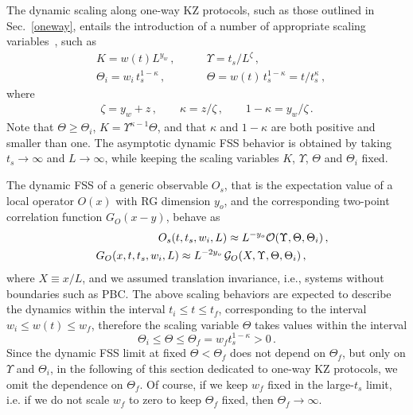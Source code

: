 The dynamic scaling along one-way KZ protocols, such as those outlined
in Sec.~\ref{oneway}, entails the introduction of a number of
appropriate scaling variables~\cite{RV-21}, such as
\begin{eqnarray}
  &K = w(t) L^{y_w}\,, \qquad &\Upsilon = t_s/L^{\zeta}\,,  
  \label{KZscavar}\\
  &\Theta_i
  = w_i\, t_s^{1-\kappa} \,,\qquad &\Theta = w(t) \,
  t_s^{1-\kappa} = t / t_s^{\kappa} \,,\nonumber
\end{eqnarray}
where
\begin{eqnarray}
\zeta = y_w + z\,,\qquad 
\kappa = {z/\zeta} \,,\qquad
1-\kappa = {y_w/\zeta}\,.\label{KZexps}
\end{eqnarray}
Note that $\Theta\ge \Theta_i$, $K= \Upsilon^{\kappa-1}\Theta$, and
that $\kappa$ and $1-\kappa$ are both positive and smaller than one.
The asymptotic dynamic FSS behavior is obtained by taking
$t_s\to\infty$ and $L\to\infty$, while keeping the scaling variables
$K$, $\Upsilon$, $\Theta$ and $\Theta_i$ fixed.

The dynamic FSS of a generic observable $O_s$, that is the expectation
value of a local operator $O(x)$ with RG dimension $y_o$, and the
corresponding two-point correlation function $G_O(x-y)$, behave
as~\cite{RV-21}
\begin{eqnarray}
  && O_s(t,t_s,w_i,L) \approx L^{-y_o} {\cal
    O}(\Upsilon,\Theta,\Theta_i)\,,
  \label{magscao}\\
&&    G_O(x,t,t_s,w_i,L) \approx L^{-2y_o}\,
  {\cal G}_O(X,\Upsilon,\Theta,\Theta_i)\,,\qquad
  \label{G2scao}
\end{eqnarray}
where $X\equiv x/L$, and we assumed translation invariance, i.e.,
systems without boundaries such as PBC. The above scaling behaviors
are expected to describe the dynamics within the interval $t_i\le t
\le t_f$, corresponding to the interval $w_i\le w(t) \le w_f$,
therefore the scaling variable $\Theta$ takes values within the
interval
\begin{equation}
  \Theta_i \le \Theta \le \Theta_f = w_f t_s^{1-\kappa}>0\,.
  \label{intomega}
  \end{equation}
Since the dynamic FSS limit at fixed $\Theta<\Theta_f$ does not depend
on $\Theta_f$, but only on $\Upsilon$ and $\Theta_i$, in the following
of this section dedicated to one-way KZ protocols, we omit the
dependence on $\Theta_f$. Of course, if we keep $w_f$ fixed in the
large-$t_s$ limit, i.e. if we do not scale $w_f$ to zero to keep
$\Theta_f$ fixed, then $\Theta_f\to\infty$.

